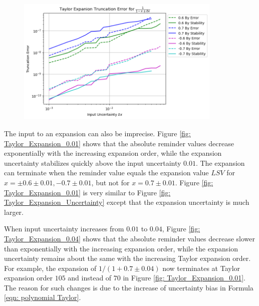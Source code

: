 \documentclass[twoside]{article}
\numberwithin{equation}{section}
\begin{document}
\begin{figure}[p]
\centering
\includegraphics[height=2.4in]{Taylor_Expansion_Error.png} 
\label{fig: Taylor_Expansion_Error}
\end{figure}


The input to an expansion can also be imprecise.
Figure \ref{fig: Taylor_Expansion_0.01} shows that the absolute reminder values decrease exponentially with the increasing expansion order, while the expansion uncertainty stabilizes quickly above the input uncertainty $0.01$.  
The expansion can terminate when the reminder value equals the expansion value $LSV$ for $x=\pm 0.6 \pm 0.01, -0.7 \pm 0.01$, but not for $x=0.7 \pm 0.01$.
Figure \ref{fig: Taylor_Expansion_0.01} is very similar to Figure \ref{fig: Taylor_Expansion_Uncertainty} except that the expansion uncertainty is much larger.

When input uncertainty increases from $0.01$ to $0.04$, Figure \ref{fig: Taylor_Expansion_0.04} shows that the absolute reminder values decrease slower than exponentially with the increasing expansion order, while the expansion uncertainty remains about the same with the increasing Taylor expansion order.
For example, the expansion of $1/(1 + 0.7 \pm 0.04)$ now terminates at Taylor expansion order $105$ and instead of $70$ in Figure \ref{fig: Taylor_Expansion_0.01}.
The reason for such changes is due to the increase of uncertainty bias in Formula \eqref{eqn: polynomial Taylor}.
\end{document}
